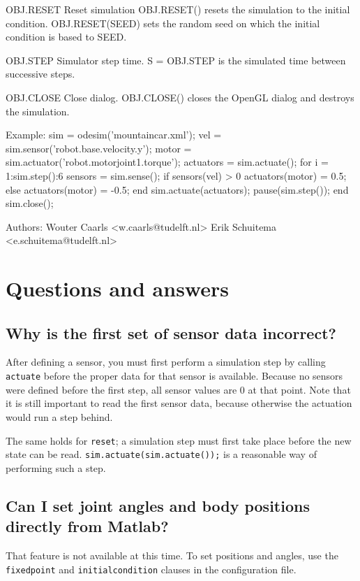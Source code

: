 \documentclass{article}
\newcommand{\txt}[1]{\texttt{#1}}
\newenvironment{code}{\alltt\small}{\endalltt}
\begin{document}
\begin{code}
      OBJ.RESET Reset simulation
         OBJ.RESET() resets the simulation to the initial condition.
         OBJ.RESET(SEED) sets the random seed on which the initial
         condition is based to SEED.

      OBJ.STEP Simulator step time.
         S = OBJ.STEP is the simulated time between successive steps.

      OBJ.CLOSE Close dialog.
         OBJ.CLOSE() closes the OpenGL dialog and destroys the simulation.

   Example:
      sim = odesim('mountaincar.xml');
      vel = sim.sensor('robot.base.velocity.y');
      motor = sim.actuator('robot.motorjoint1.torque');
      actuators = sim.actuate();
      for i = 1:sim.step():6
        sensors = sim.sense();
        if sensors(vel) > 0
          actuators(motor) = 0.5;
        else
          actuators(motor) = -0.5;
        end
        sim.actuate(actuators);
        pause(sim.step());
      end
      sim.close();

   Authors:
     Wouter Caarls <w.caarls@tudelft.nl>
     Erik Schuitema <e.schuitema@tudelft.nl>
\end{code}

\section{Questions and answers}
\subsection*{Why is the first set of sensor data incorrect?}
After defining a sensor, you must first perform a simulation step by calling \txt{actuate} before the proper data for that sensor is available. Because no sensors were defined before the first step, all sensor values are 0 at that point. Note that it is still important to read the first sensor data, because otherwise the actuation would run a step behind.

The same holds for \txt{reset}; a simulation step must first take place before the new state can be read. \txt{sim.actuate(sim.actuate());} is a reasonable way of performing such a step. 

\subsection*{Can I set joint angles and body positions directly from Matlab?}
That feature is not available at this time. To set positions and angles, use the \txt{fixedpoint} and \txt{initialcondition} clauses in the configuration file.
\end{document}
